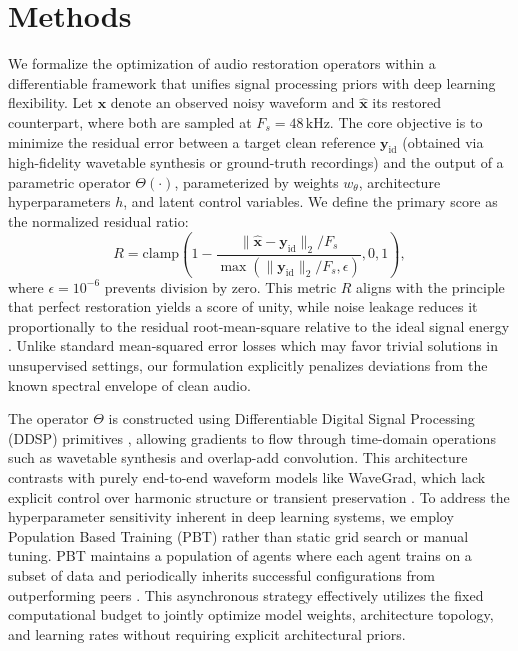 \section{Methods}

We formalize the optimization of audio restoration operators within a differentiable framework that unifies signal processing priors with deep learning flexibility. Let $\mathbf{x}$ denote an observed noisy waveform and $\hat{\mathbf{x}}$ its restored counterpart, where both are sampled at $F_s = 48\,\text{kHz}$. The core objective is to minimize the residual error between a target clean reference $\mathbf{y}_{\mathrm{id}}$ (obtained via high-fidelity wavetable synthesis or ground-truth recordings) and the output of a parametric operator $\Theta(\cdot)$, parameterized by weights $w_\theta$, architecture hyperparameters $h$, and latent control variables. We define the primary score as the normalized residual ratio:
\begin{equation}
R = \text{clamp}\left(1 - \frac{\|\hat{\mathbf{x}} - \mathbf{y}_{\mathrm{id}}\|_2 / F_s}{\max(\|\mathbf{y}_{\mathrm{id}}\|_2/F_s, \epsilon)}, 0, 1\right),
\end{equation}
where $\epsilon = 10^{-6}$ prevents division by zero. This metric $R$ aligns with the principle that perfect restoration yields a score of unity, while noise leakage reduces it proportionally to the residual root-mean-square relative to the ideal signal energy \citep{jaderberg2017pbt}. Unlike standard mean-squared error losses which may favor trivial solutions in unsupervised settings, our formulation explicitly penalizes deviations from the known spectral envelope of clean audio.

The operator $\Theta$ is constructed using Differentiable Digital Signal Processing (DDSP) primitives \citep{engel2020ddsp}, allowing gradients to flow through time-domain operations such as wavetable synthesis and overlap-add convolution. This architecture contrasts with purely end-to-end waveform models like WaveGrad, which lack explicit control over harmonic structure or transient preservation \citep{shan2021diffwave}. To address the hyperparameter sensitivity inherent in deep learning systems, we employ Population Based Training (PBT) rather than static grid search or manual tuning. PBT maintains a population of agents where each agent trains on a subset of data and periodically inherits successful configurations from outperforming peers \citep{jaderberg2017pbt}. This asynchronous strategy effectively utilizes the fixed computational budget to jointly optimize model weights, architecture topology, and learning rates without requiring explicit architectural priors.

